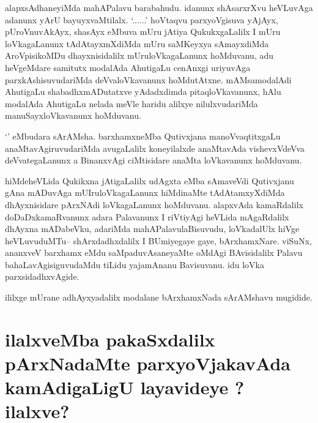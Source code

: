 \begin{artha}
alapxsAdhaneyiMda mahAPalavu barabahudu. idanunx shAsarxrXvu heVLuvAga adanunx yArU bayuyxvaMtilalx. `\stext ......' hoVtaqvu parxyoVgisuva yAjAyx, pUroVnuvAkAyx, shasAyx eMbuva mUru jAtiya QukukxgaLalilx I mUru loVkagaLanunx tAdAtayxmXdiMda  mUru saMKeyxya sAmayxdiMda AroVpisikoMDu dhayxnisidalilx mUruloVkagaLanunx hoMduvanu, adu heVgeMdare samitutx modalAda AhutigaLu cenAnxgi uriyuvAga parxkAshisuvudariMda deVvaloVkavanunx hoMdutAtxne. mAMsamodalAdi AhutigaLu shabadhxmADutatxve yAdadxdimda pitaqloVkavanunx, hAlu modalAda AhutigaLu nelada meVle haridu alilxye nilulxvudariMda manuSayxloVkavanunx hoMduvanu.

`\stext' eMbudara sArAMsha. barxhamxneMba Qutivxjana manoVvaqtitxgaLu 
anaMtavAgiruvudariMda avugaLalilx koneyilalxde anaMtavAda vishevxVdeVva deVvategaLanunx 
a BinanxvAgi ciMtisidare anaMta loVkavanunx hoMduvanu.
\end{artha}

\begin{center}
\end{center}

\begin{artha}
hiMdeheVLida  Qukikxna jAtigaLalilx udAgxta eMba sAmaveVdi Qutivxjanu  gAna mADuvAga mUIruloVkagaLanunx hiMdinaMte tAdAtamxyXdiMda dhAyxnisidare pArxNAdi loVkagaLanunx hoMduvanu. alapxvAda kamaRdalilx doDaDxkamaRvanunx adara Palavanunx I riVtiyAgi heVLida mAgaRdalilx dhAyxna mADabeVku, adariMda mahAPalavulaBisuvudu, loVkadalUlx hiVge heVLuvuduMTu-- shArxdadhxdalilx I BUmiyegaye gaye, bArxhamxNare. viSuNx, ananxveV barxhamx eMdu saMpaduvAsaneyaMte oMdAgi BAvisidalilx Palavu bahaLavAgisiguvudaMdu tiLidu yajamAnanu Bavisuvanu. idu loVka parxsidadhxvAgide.
\end{artha}

\begin{center}
ililxge mUrane adhAyxyadalilx modalane bArxhamxNada sArAMshavu mugidide.
\end{center}

\section*{ilalxveMba pakaSxdalilx pArxNadaMte parxyoVjakavAda kamAdigaLigU layavideye ? 
ilalxve?}


